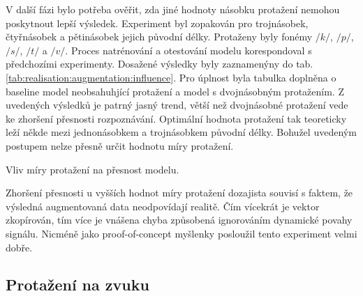 V další fázi bylo potřeba ověřit, zda jiné hodnoty násobku protažení nemohou poskytnout lepší výsledek.
Experiment byl zopakován pro trojnásobek, čtyřnásobek a pětinásobek jejich původní délky.
Protaženy byly fonémy $/k/$, $/p/$, $/s/$, $/t/$ a $/v/$.
Proces natrénování a otestování modelu korespondoval s předchozími experimenty.
Dosažené výsledky byly zaznamenýny do tab. \ref{tab:realisation:augmentation:influence}.
Pro úplnost byla tabulka doplněna o baseline model neobsahuhjící protažení a model s dvojnásobným protažením.
Z uvedených výsledků je patrný jasný trend, větší než dvojnásobné protažení vede ke zhoršení přesnosti rozpoznávání.
Optimální hodnota protažení tak teoreticky leží někde mezi jednonásobkem a trojnásobkem původní délky.
Bohužel uvedeným postupem nelze přesně určit hodnotu míry protažení.

\begin{table}[htpb]
  \centering
  \def\arraystretch{1.5}
  \caption{Vliv míry protažení na přesnost modelu.}
  \label{tab:realisation:augmentation:influence}
\end{table}

Zhoršení přesnosti u vyšších hodnot míry protažení dozajista souvisí s faktem, že výsledná augmentovaná data neodpovídají realitě. Čím vícekrát je vektor zkopírován, tím více je vnášena chyba způsobená ignorováním dynamické povahy signálu. Nicméně jako proof-of-concept myšlenky posloužil tento experiment velmi dobře.

\subsection{Protažení na zvuku}
\label{chap:realisation:augmentation:audio}

